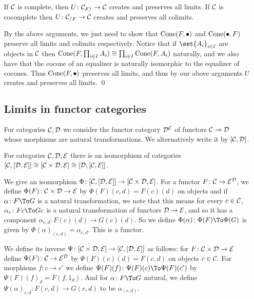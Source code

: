 \bprop

    If ${{\cal C}}$ is complete, then $U\colon{{\cal C}}_{F/}\to{{\cal C}}$ creates and preserves all limits.
    If ${{\cal C}}$ is cocomplete then $U\colon{{\cal C}}_{/F}\to{{\cal C}}$ creates and preserves all colimits.

\eprop

\bproof

    By the above arguments, we just need to show that ${\rm Cone}(F,\bullet)$ and ${\rm Cone}(\bullet,F)$ preserve all limits and colimits respectively.
    Notice that if $\set{A_i}_{i\in I}$ are objects in ${{\cal C}}$ then ${\rm Cone}(F,\prod_{i\in I}A_i)\cong\prod_{i\in I}{\rm Cone}(F,A_i)$ naturally, and we also have that
    the cocone of an equalizer is naturally isomorphic to the equalizer of cocones.
    Thus ${\rm Cone}(F,\bullet)$ preserves all limits, and thus by our above arguments $U$ creates and preserves all limits.
    \qed

\eproof

\subsection{Limits in functor categories}

For categories ${{\cal C}},{{\cal D}}$ we consider the functor category ${{\cal D}}^{{\cal C}}$ of functors ${{\cal C}}\to{{\cal D}}$ whose morphisms are natural transformations.
We alternatively write it by $[{{\cal C}},{{\cal D}}]$.

\blemm

    For categories ${{\cal C}},{{\cal D}},{{\cal E}}$ there is an isomorphism of categories $[{{\cal C}},[{{\cal D}},{{\cal E}}]]\cong[{{\cal C}}\times{{\cal D}},{{\cal E}}]\cong[{{\cal D}},[{{\cal C}},{{\cal E}}]]$.

\elemm

\bproof

    We give an isomorphism $\Phi\colon[{{\cal C}},[{{\cal D}},{{\cal E}}]]\to[{{\cal C}}\times{{\cal D}},{{\cal E}}]$.
    For a functor $F\colon{{\cal C}}\to{{\cal E}}^{{\cal D}}$, we define $\Phi(F)\colon{{\cal C}}\times{{\cal D}}\to{{\cal E}}$ by $\Phi(F)(c,d)=F(c)(d)$ on objects and if $\alpha\colon F\To G$ is a natural transformation,
    we note that this means for every $c\in{{\cal C}}$, $\alpha_c\colon Fc\To Gc$ is a natural transformation of functors ${{\cal D}}\to{{\cal E}}$, and so it has a component $\alpha_{c,d}\colon F(c)(d)\to G(c)(d)$.
    So we define $\Phi(\alpha)\colon\Phi(F)\To\Phi(G)$ is given by $\Phi(\alpha)_{(c,d)}=\alpha_{c,d}$.
    This is a functor.

    We define its inverse $\Psi\colon[{{\cal C}}\times{{\cal D}},{{\cal E}}]\to[{{\cal C}},[{{\cal D}},{{\cal E}}]]$ as follows: for $F\colon{{\cal C}}\times{{\cal D}}\to{{\cal E}}$ define $\Psi(F)\colon{{\cal C}}\to{{\cal E}}^{{\cal D}}$ by $\Psi(F)(c)(d)=F(c,d)$ on objects $c\in{{\cal C}}$.
    For morphisms $f\colon c\to c'$ we define $\Psi(F)(f)\colon\Psi(F)(c)\To\Psi(F)(c')$ by $\Psi(F)(f)_d=F(f,1_d)$.
    And for $\alpha\colon F\To G$ natural, we define $\Psi(\alpha)_{c,d}\colon F(c,d)\to G(c,d)$ to be $\alpha_{(c,d)}$.

